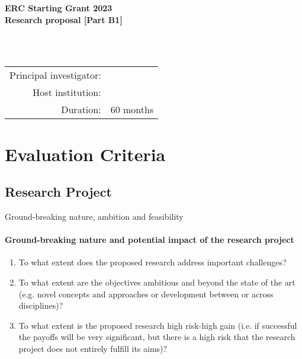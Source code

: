 


\begin{titlepage}
\thispagestyle{empty}
\begin{center}
\textbf{ERC Starting Grant 2023}\\
\textbf{Research proposal [Part B1]}\\
\vspace*{2cm}
\begin{LARGE}
\textbf{\prnamelong{}}\\
\textbf{\prname{}}\\
\end{LARGE}
\vspace*{2cm}
\begin{Large}
\begin{tabular}{rl}
Principal investigator: & \piname{}\\
Host institution:&  \hi{}\\
Duration:& 60 months
\end{tabular}
\end{Large}
\date{}
\end{center}
\vspace*{2cm}

\end{titlepage}
\clearpage
\newpage



\section{Evaluation Criteria}
\subsection{Research Project}
Ground-breaking nature, ambition and feasibility

\paragraph{Ground-breaking nature and potential impact of the research project}
\begin{enumerate}
	\item To what extent does the proposed research address important challenges?
	\item To what extent are the objectives ambitious and beyond the state of the art (e.g. novel concepts and
	approaches or development between or across disciplines)?
	\item To what extent is the proposed research high risk-high gain (i.e. if successful the payoffs will be very
	significant, but there is a high risk that the research project does not entirely fulfill its aims)?
\end{enumerate}
